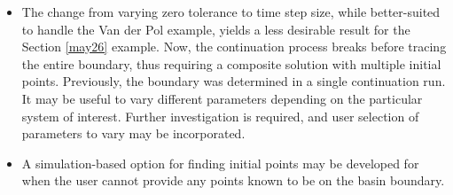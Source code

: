 \documentclass[12pt]{article}
\begin{document}
\begin{itemize}
\item The change from varying zero tolerance to time step size, while better-suited to handle the Van der Pol example, yields a less desirable result for the Section \ref{may26} example. Now, the continuation process breaks before tracing the entire boundary, thus requiring a composite solution with multiple initial points. Previously, the boundary was determined in a single continuation run. It may be useful to vary different parameters depending on the particular system of interest. Further investigation is required, and user selection of parameters to vary may be incorporated.

\item A simulation-based option for finding initial points may be developed for when the user cannot provide any points known to be on the basin boundary.

\end{itemize}





\end{document}

